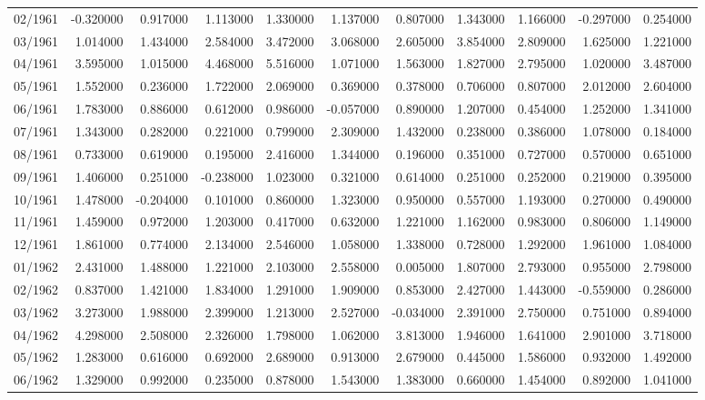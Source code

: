\begin{tabular}{lrrrrrrrrrr}
02/1961 & -0.320000 & 0.917000 & 1.113000 & 1.330000 & 1.137000 & 0.807000 & 1.343000 & 1.166000 & -0.297000 & 0.254000 \\
03/1961 & 1.014000 & 1.434000 & 2.584000 & 3.472000 & 3.068000 & 2.605000 & 3.854000 & 2.809000 & 1.625000 & 1.221000 \\
04/1961 & 3.595000 & 1.015000 & 4.468000 & 5.516000 & 1.071000 & 1.563000 & 1.827000 & 2.795000 & 1.020000 & 3.487000 \\
05/1961 & 1.552000 & 0.236000 & 1.722000 & 2.069000 & 0.369000 & 0.378000 & 0.706000 & 0.807000 & 2.012000 & 2.604000 \\
06/1961 & 1.783000 & 0.886000 & 0.612000 & 0.986000 & -0.057000 & 0.890000 & 1.207000 & 0.454000 & 1.252000 & 1.341000 \\
07/1961 & 1.343000 & 0.282000 & 0.221000 & 0.799000 & 2.309000 & 1.432000 & 0.238000 & 0.386000 & 1.078000 & 0.184000 \\
08/1961 & 0.733000 & 0.619000 & 0.195000 & 2.416000 & 1.344000 & 0.196000 & 0.351000 & 0.727000 & 0.570000 & 0.651000 \\
09/1961 & 1.406000 & 0.251000 & -0.238000 & 1.023000 & 0.321000 & 0.614000 & 0.251000 & 0.252000 & 0.219000 & 0.395000 \\
10/1961 & 1.478000 & -0.204000 & 0.101000 & 0.860000 & 1.323000 & 0.950000 & 0.557000 & 1.193000 & 0.270000 & 0.490000 \\
11/1961 & 1.459000 & 0.972000 & 1.203000 & 0.417000 & 0.632000 & 1.221000 & 1.162000 & 0.983000 & 0.806000 & 1.149000 \\
12/1961 & 1.861000 & 0.774000 & 2.134000 & 2.546000 & 1.058000 & 1.338000 & 0.728000 & 1.292000 & 1.961000 & 1.084000 \\
01/1962 & 2.431000 & 1.488000 & 1.221000 & 2.103000 & 2.558000 & 0.005000 & 1.807000 & 2.793000 & 0.955000 & 2.798000 \\
02/1962 & 0.837000 & 1.421000 & 1.834000 & 1.291000 & 1.909000 & 0.853000 & 2.427000 & 1.443000 & -0.559000 & 0.286000 \\
03/1962 & 3.273000 & 1.988000 & 2.399000 & 1.213000 & 2.527000 & -0.034000 & 2.391000 & 2.750000 & 0.751000 & 0.894000 \\
04/1962 & 4.298000 & 2.508000 & 2.326000 & 1.798000 & 1.062000 & 3.813000 & 1.946000 & 1.641000 & 2.901000 & 3.718000 \\
05/1962 & 1.283000 & 0.616000 & 0.692000 & 2.689000 & 0.913000 & 2.679000 & 0.445000 & 1.586000 & 0.932000 & 1.492000 \\
06/1962 & 1.329000 & 0.992000 & 0.235000 & 0.878000 & 1.543000 & 1.383000 & 0.660000 & 1.454000 & 0.892000 & 1.041000 \\

\end{tabular}
